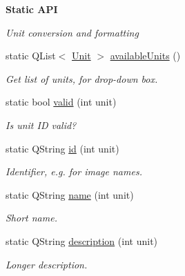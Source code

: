\begin{Indent}\textbf{ Static A\+PI}\par
{\em Unit conversion and formatting }\begin{DoxyCompactItemize}
\item 
\mbox{\label{class_bitcoin_units_acb8409daeca006436380f69b4ad4903a}} 
static Q\+List$<$ \mbox{\hyperlink{class_bitcoin_units_ae41018ba530b4c8bdc74fd163709fb9d}{Unit}} $>$ \mbox{\hyperlink{class_bitcoin_units_acb8409daeca006436380f69b4ad4903a}{available\+Units}} ()
\begin{DoxyCompactList}\small\item\em Get list of units, for drop-\/down box. \end{DoxyCompactList}\item 
\mbox{\label{class_bitcoin_units_a81cbc41480adfb600dad79711d336e5f}} 
static bool \mbox{\hyperlink{class_bitcoin_units_a81cbc41480adfb600dad79711d336e5f}{valid}} (int unit)
\begin{DoxyCompactList}\small\item\em Is unit ID valid? \end{DoxyCompactList}\item 
\mbox{\label{class_bitcoin_units_a595f9407b7113f660bec04155e2c7394}} 
static Q\+String \mbox{\hyperlink{class_bitcoin_units_a595f9407b7113f660bec04155e2c7394}{id}} (int unit)
\begin{DoxyCompactList}\small\item\em Identifier, e.\+g. for image names. \end{DoxyCompactList}\item 
\mbox{\label{class_bitcoin_units_a4cf46136434ed30728608e67e90a9cbe}} 
static Q\+String \mbox{\hyperlink{class_bitcoin_units_a4cf46136434ed30728608e67e90a9cbe}{name}} (int unit)
\begin{DoxyCompactList}\small\item\em Short name. \end{DoxyCompactList}\item 
\mbox{\label{class_bitcoin_units_a8918c3f3da1279d923256166aa7066ae}} 
static Q\+String \mbox{\hyperlink{class_bitcoin_units_a8918c3f3da1279d923256166aa7066ae}{description}} (int unit)
\begin{DoxyCompactList}\small\item\em Longer description. \end{DoxyCompactList}\item 

\end{DoxyCompactItemize}
\end{Indent}
